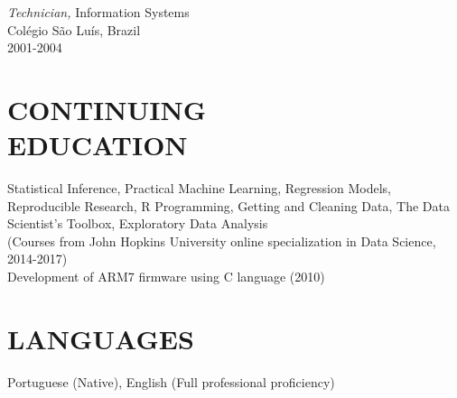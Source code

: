 \documentclass[line,margin]{res}
\begin{document}
\begin{resume}
                   {\sl Technician,} Information Systems \\
                Colégio São Luís, Brazil \\
                2001-2004
	
\section{CONTINUING \\ EDUCATION} Statistical Inference, Practical Machine Learning, Regression Models, Reproducible Research, 
                                    R Programming, Getting and Cleaning Data, The Data Scientist's Toolbox, Exploratory Data Analysis\\
                                    (Courses from John Hopkins University online specialization in Data Science, 2014-2017)\\
                                  Development of ARM7 firmware using C language (2010)

\section{LANGUAGES} Portuguese (Native), English (Full professional proficiency)
 
\end{resume}
\end{document}

